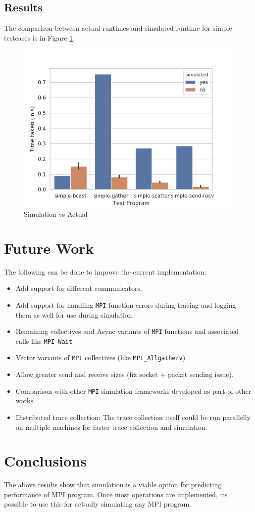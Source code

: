 \documentclass[10pt,conference]{IEEEtran}
\begin{document}
\subsection{Results}
The comparison between actual runtimes and simulated runtime for simple
testcases is in Figure \ref{fig:2}.

\begin{figure}
  \includegraphics[width=\linewidth]{plot}
  \caption{ Simulation vs Actual }
  \label{fig:2}
\end{figure}

\section{Future Work}
The following can be done to improve the current implementation:
\begin{itemize}
  \item Add support for different communicators.
  \item Add support for handling \texttt{MPI} function errors during tracing and
    logging them as well for use during simulation.
  \item Remaining collectives and Async variants of \texttt{MPI} functions and
    associated calls like \texttt{MPI\_Wait}
  \item Vector variants of \texttt{MPI} collectives (like
    \texttt{MPI\_Allgatherv})
  \item Allow greater send and receive sizes (fix socket + packet sending
    issue).
  \item Comparison with other \texttt{MPI} simulation frameworks developed as
    part of other works.
  \item Distributed trace collection: The trace collection itself could be run
    parallelly on multiple machines for faster trace collection and simulation.
\end{itemize}

\section{Conclusions}
The above results show that simulation is a viable option for predicting
performance of MPI program. Once most operations are implemented, its possible
to use this for actually simulating any MPI program.



\end{document}
